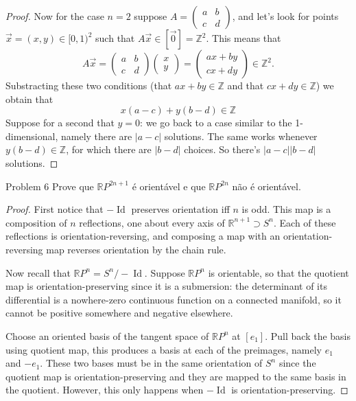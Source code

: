 \begin{proof}
	Now for the case  \(n=2\) suppose \(A=\begin{pmatrix} a & b\\c & d \end{pmatrix} \), and let's look for points \(\vec{x}=(x,y) \in [0,1)^2\) such that \(A\vec{x} \in [\vec{0}]=\mathbb{Z}^2\). This means that
	\[A \vec{x}=\begin{pmatrix} a & b\\c & d \end{pmatrix} \begin{pmatrix} x\\y \end{pmatrix} =\begin{pmatrix} ax+by\\cx+dy \end{pmatrix} \in \mathbb{Z}^2.\]
	 Substracting these two conditions (that \(ax+by \in \mathbb{Z}\) and that \(cx+dy \in \mathbb{Z}\)) we obtain that
	 \[x(a-c) + y(b-d) \in \mathbb{Z}\]
	Suppose for a second that \(y=0\): we go back to a case similar to the 1-dimensional, namely there are \(|a-c|\) solutions. The same works whenever \(y(b-d) \in \mathbb{Z}\), for which there are \(|b-d|\) choices. So there's \(|a-c||b-d|\) solutions.
\fi
\end{proof}


\begin{thing1}{Problem 6}\label{prob:6}\leavevmode
Prove que \(\mathbb{R}P^{2n+1}\) é orientável e que \(\mathbb{R}P^{2n}\) não é orientável.
\end{thing1}

\begin{proof}\leavevmode
	First notice that \(-\operatorname{Id}\) preserves orientation iff \(n\) is odd. This map is a composition of \(n\) reflections, one about every axis of \(\mathbb{R}^{n+1}\supset S^n\). Each of these reflections is orientation-reversing, and composing a map with an orientation-reversing map reverses orientation by the chain rule.

	Now recall that \(\mathbb{R}P^{n}=S^{n}/-\operatorname{Id}\). Suppose \(\mathbb{R}P^{n}\) is orientable, so that the quotient map is orientation-preserving since it is a submersion: the determinant of its differential is a nowhere-zero continuous function on a connected manifold, so it cannot be positive somewhere and negative elsewhere.

	Choose an oriented basis of the tangent space of \(\mathbb{R}P^{n}\) at \([e_1]\). Pull back the basis using quotient map, this produces a basis at each of the preimages, namely \(e_1\) and \(-e_1\). These two bases must be in the same orientation of \(S^{n}\) since the quotient map is orientation-preserving and they are mapped to the same basis in the quotient. However, this only happens when \(-\operatorname{Id}\) is orientation-preserving.
\end{proof}




